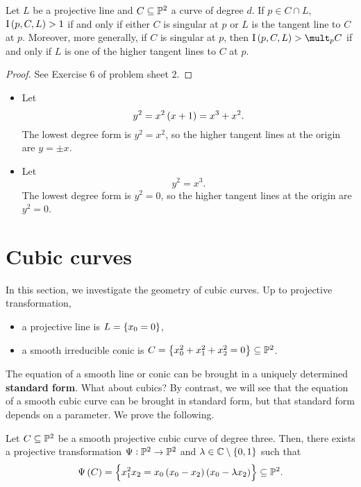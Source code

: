 \begin{proposition}
\label{prop:12.14}
Let $ L $ be a projective line and $ C \subseteq \mathbb{P}^2 $ a curve of degree $ d $. If $ p \in C \cap L $, $ \I\br{p, C, L} > 1 $ if and only if either $ C $ is singular at $ p $ or $ L $ is the tangent line to $ C $ at $ p $. Moreover, more generally, if $ C $ is singular at $ p $, then $ \I\br{p, C, L} > \mult_p C $ if and only if $ L $ is one of the higher tangent lines to $ C $ at $ p $.
\end{proposition}

\begin{proof}
See Exercise $ 6 $ of problem sheet $ 2 $.
\end{proof}

\begin{example*}
\hfill
\begin{itemize}
\item Let
$$ y^2 = x^2\br{x + 1} = x^3 + x^2. $$
The lowest degree form is $ y^2 = x^2 $, so the higher tangent lines at the origin are $ y = \pm x $.
\item Let
$$ y^2 = x^3. $$
The lowest degree form is $ y^2 = 0 $, so the higher tangent lines at the origin are $ y^2 = 0 $.
\end{itemize}
\end{example*}

\pagebreak

\section{Cubic curves}

In this section, we investigate the geometry of cubic curves. Up to projective transformation,
\begin{itemize}
\item a projective line is $ L = \cbr{x_0 = 0} $,
\item a smooth irreducible conic is $ C = \cbr{x_0^2 + x_1^2 + x_2^2 = 0} \subseteq \PP^2 $.
\end{itemize}
The equation of a smooth line or conic can be brought in a uniquely determined \textbf{standard form}. What about cubics? By contrast, we will see that the equation of a smooth cubic curve can be brought in standard form, but that standard form depends on a parameter. We prove the following.

\begin{theorem}
\label{thm:13.1}
Let $ C \subseteq \mathbb{P}^2 $ be a smooth projective cubic curve of degree three. Then, there exists a projective transformation $ \Psi : \mathbb{P}^2 \to \mathbb{P}^2 $ and $ \lambda \in \CC \setminus \cbr{0, 1} $ such that
$$ \Psi\br{C} = \cbr{x_1^2x_2 = x_0\br{x_0 - x_2}\br{x_0 - \lambda x_2}} \subseteq \PP^2. $$
\end{theorem}

